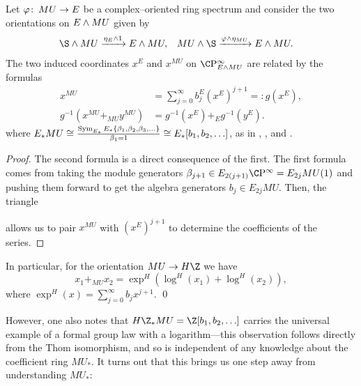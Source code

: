 \begin{lemma}\label{OrientationsOnEAndMU}
Let \(\varphi\colon\thinspace MU \to E\) be a complex--oriented ring spectrum and consider the two orientations on \(E \wedge MU\) given by
\begin{align*}
\S \sm MU & \xrightarrow{\eta_E \sm 1} E \sm MU, &
MU \sm \S & \xrightarrow{\phi \sm \eta_{MU}} E \sm MU.
\end{align*}
The two induced coordinates \(x^E\) and \(x^{MU}\) on \(\CP^\infty_{E \sm MU}\) are related by the formulas
\begin{align*}
x^{MU} & = \sum_{j=0}^\infty b_j^E (x^E)^{j+1} =: g(x^E), \\
g^{-1}(x^{MU} +_{MU} y^{MU}) & = g^{-1}(x^E) +_E g^{-1}(y^E).
\end{align*}
where \(E_* MU \cong \frac{\operatorname{Sym}_{E_*} E_*\{\beta_1, \beta_2, \beta_3, \ldots\}}{\beta_1 = 1} \cong E_*[b_1, b_2, \ldots]\), as in , , and .
\end{lemma}
\begin{proof}
The second formula is a direct consequence of the first.  The first formula comes from taking the module generators \(\beta_{j+1} \in E_{2(j+1)} \CP^\infty = E_{2j} MU(1)\) and pushing them forward to get the algebra generators \(b_j \in E_{2j} MU\).  Then, the triangle
\begin{center}
\end{center}
allows us to pair \(x^{MU}\) with \((x^E)^{j+1}\) to determine the coefficients of the series.
\end{proof}

\begin{corollary}\label{HZMUCarriesALog}
In particular, for the orientation \(MU \to H\Z\) we have \[x_1 +_{MU} x_2 = \exp^H(\log^H(x_1) + \log^H(x_2)),\] where \(\exp^H(x) = \sum_{j=0}^\infty b_j x^{j+1}\). \qed
\end{corollary}

However, one also notes that \(H\Z_* MU = \Z[b_1, b_2, \ldots]\) carries the universal example of a formal group law with a logarithm---this observation follows directly from the Thom isomorphism, and so is independent of any knowledge about the coefficient ring \(MU_*\).  It turns out that this brings us one step away from understanding \(MU_*\):

